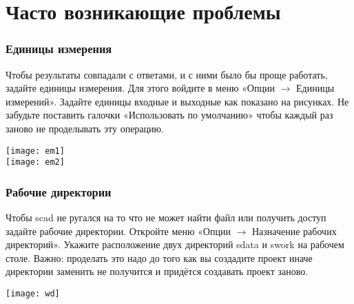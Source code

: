 \documentclass[a4paper,12pt]{article}
\begin{document}
\part*{Часто возникающие проблемы}

\section{Единицы измерения} 
        Чтобы результаты совпадали с ответами, и с ними было бы проще работать, 
        задайте единицы измерения. Для этого войдите в меню «Опции $\to$ Единицы измерений». 
        Задайте единицы входные и выходные как показано на рисунках. 
        Не забудьте поставить галочки «Использовать по умолчанию» 
        чтобы каждый раз заново не проделывать эту операцию. \\
        \begin{center}
            \texttt{[image: em1]} \\
            \texttt{[image: em2]}
        \end{center}
        \section{Рабочие директории}
        Чтобы scad не ругался на то что не может найти файл 
        или получить доступ задайте рабочие директории. 
    Откройте меню «Опции $\to$ Назначение рабочих директорий». 
        Укажите расположение двух директорий sdata и swork на рабочем столе. 
        Важно: проделать это надо до того как вы создадите проект 
        иначе директории заменить не получится и придётся создавать проект заново.\\
        \begin{center}
        \texttt{[image: wd]}
        \end{center}
\end{document}
